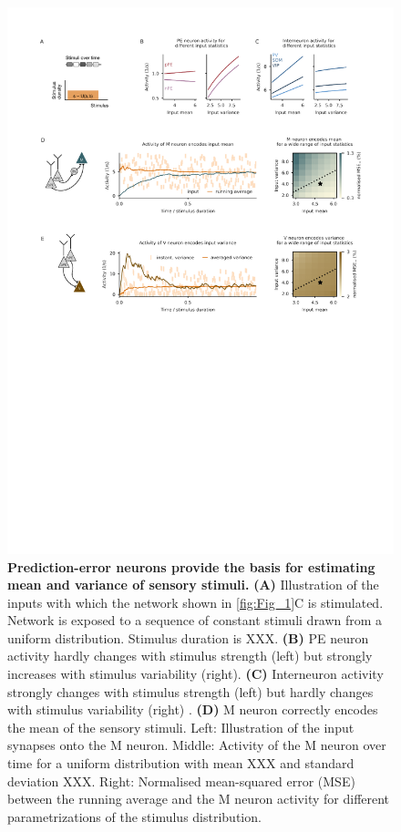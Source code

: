 \documentclass[10pt,a4paper]{article}
\begin{document}
\begin{figure}[t!]
	\centering
    \includegraphics[width=1\linewidth]{../results/figures/final/Fig_2}
\caption{\footnotesize{\bf Prediction-error neurons provide the basis for estimating mean and variance of sensory stimuli.\newline} 
{\bf (A)} Illustration of the inputs with which the network shown in \ref{fig:Fig_1}C is stimulated. Network is exposed to a sequence of constant stimuli drawn from a uniform distribution. Stimulus duration is XXX.
{\bf (B)} PE neuron activity hardly changes with stimulus strength (left) but strongly increases with stimulus variability (right).
{\bf (C)} Interneuron activity strongly changes with stimulus strength (left) but hardly changes with stimulus variability (right) .
{\bf (D)} M neuron correctly encodes the mean of the sensory stimuli. Left: Illustration of the input synapses onto the M neuron. Middle: Activity of the M neuron over time for a uniform distribution with mean XXX and standard deviation XXX. Right: Normalised mean-squared error (MSE) between the running average and the M neuron activity for different parametrizations of the stimulus distribution.
}
\end{figure}
\end{document}
